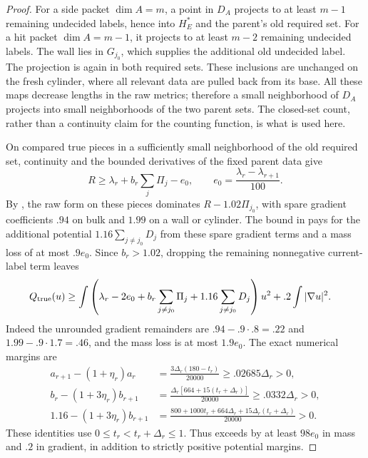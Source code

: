 \begin{proof}
For a side packet $\dim A=m$, a point in $D_A$ projects to at least
$m-1$ remaining undecided labels, hence into $H_E^*$ and the parent's
old required set.  For a hit packet $\dim A=m-1$, it projects to at
least $m-2$ remaining undecided labels.  The wall lies in $G_{j_0}$,
which supplies the additional old undecided label.  The projection is
again in both required sets.  These inclusions are unchanged on the
fresh cylinder, where all relevant data are pulled back from its base.
All these maps decrease lengths in the raw metrics; therefore a small
neighborhood of $D_A$ projects into small neighborhoods of the two
parent sets.  The closed-set count, rather than a continuity claim for
the counting function, is what is used here.

On compared true pieces in a sufficiently small neighborhood of the
old required set, continuity and the bounded derivatives of the fixed
parent data give
\[
 R\ge\lambda_r+b_r\sum_j\Pi_j-e_0,
 \qquad e_0=\frac{\lambda_r-\lambda_{r+1}}{100}.
\]
By , the raw form on these pieces
dominates $R-1.02\Pi_{j_0}$, with spare gradient coefficients $.94$
on bulk and $1.99$ on a wall or cylinder.  The bound in
 pays for the additional potential
$1.16\sum_{j\ne j_0}D_j$ from these spare gradient terms and a mass
loss of at most $.9e_0$.  Since
$b_r>1.02$, dropping the remaining nonnegative current-label term
leaves
\begin{align}
 Q_{\rm true}(u)&\ge
 \int\left(\lambda_r-2e_0+
       b_r\sum_{j\ne j_0}\Pi_j+
       1.16\sum_{j\ne j_0}D_j\right)u^2
       +.2\int|\nabla u|^2.\label{regular:true-budget}
\end{align}
Indeed the unrounded gradient remainders are
$.94-.9\cdot.8=.22$ and $1.99-.9\cdot1.7=.46$, and the mass loss is
at most $1.9e_0$.  The exact numerical margins are
\begin{equation}\label{regular:eta}
\begin{aligned}
 a_{r+1}-(1+\eta_r)a_r
   &=\frac{3\Delta_r(180-t_r)}{20000}
     \ge .02685\Delta_r>0,\\
 b_r-(1+3\eta_r)b_{r+1}
   &=\frac{\Delta_r[664+15(t_r+\Delta_r)]}{20000}
     \ge .0332\Delta_r>0,\\
 1.16-(1+3\eta_r)b_{r+1}
   &=\frac{800+1000t_r+664\Delta_r+
                  15\Delta_r(t_r+\Delta_r)}{20000}>0.
\end{aligned}
\end{equation}
These identities use $0\le t_r<t_r+\Delta_r\le1$.  Thus
 exceeds
 by at least $98e_0$ in mass and $.2$ in
gradient, in addition to strictly positive potential margins.


\end{proof}
